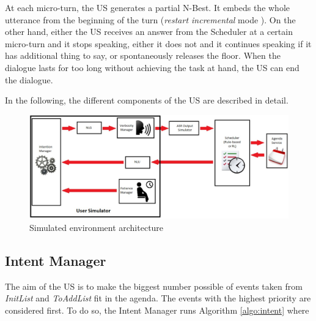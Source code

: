         At each micro-turn, the US generates a partial N-Best. It embeds the whole utterance from the beginning of the turn (\textit{restart incremental} mode \cite{Schlangen2011}). On the other hand, either the US receives an answer from the Scheduler at a certain micro-turn and it stops speaking, either it does not and it continues speaking if it has additional thing to say, or spontaneously releases the floor. When the dialogue lasts for too long without achieving the task at hand, the US can end the dialogue.
        
        In the following, the different components of the US are described in detail.
        
        \begin{figure}[htb]
          \centering
          \includegraphics[scale=0.5]{figures/ArchiSimuSys.pdf}
          \caption{Simulated environment architecture}
          \label{fig:archi}
        \end{figure}
    
    \subsection{Intent Manager}
    \label{subsec:intentmanager}
    
    	The aim of the US is to make the biggest number possible of events taken from \textit{InitList} and \textit{ToAddList} fit in the agenda. The events with the highest priority are considered first. To do so, the Intent Manager runs Algorithm \ref{algo:intent} where
        
        
